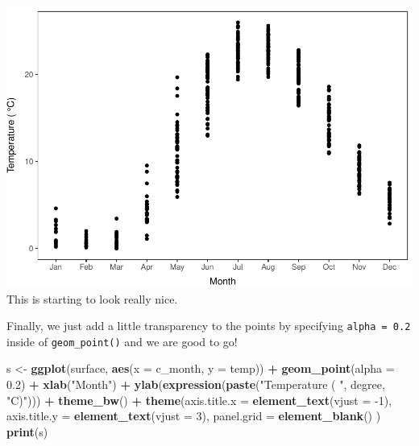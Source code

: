 \documentclass[
]{book}
\newenvironment{Shaded}{\begin{snugshade}}{\end{snugshade}}
\newcommand{\DataTypeTok}[1]{\textcolor[rgb]{0.13,0.29,0.53}{#1}}
\newcommand{\DecValTok}[1]{\textcolor[rgb]{0.00,0.00,0.81}{#1}}
\newcommand{\FloatTok}[1]{\textcolor[rgb]{0.00,0.00,0.81}{#1}}
\newcommand{\KeywordTok}[1]{\textcolor[rgb]{0.13,0.29,0.53}{\textbf{#1}}}
\newcommand{\NormalTok}[1]{#1}
\newcommand{\OperatorTok}[1]{\textcolor[rgb]{0.81,0.36,0.00}{\textbf{#1}}}
\newcommand{\StringTok}[1]{\textcolor[rgb]{0.31,0.60,0.02}{#1}}
\begin{document}
\includegraphics{worstr_files/figure-latex/unnamed-chunk-107-1.pdf}
This is starting to look really nice.

Finally, we just add a little transparency to the points by specifying \texttt{alpha\ =\ 0.2} inside of \texttt{geom\_point()} and we are good to go!

\begin{Shaded}
\begin{Highlighting}[]
\NormalTok{s <-}\StringTok{ }\KeywordTok{ggplot}\NormalTok{(surface, }\KeywordTok{aes}\NormalTok{(}\DataTypeTok{x =}\NormalTok{ c_month, }\DataTypeTok{y =}\NormalTok{ temp)) }\OperatorTok{+}
\StringTok{  }\KeywordTok{geom_point}\NormalTok{(}\DataTypeTok{alpha =} \FloatTok{0.2}\NormalTok{) }\OperatorTok{+}\StringTok{ }
\StringTok{  }\KeywordTok{xlab}\NormalTok{(}\StringTok{"Month"}\NormalTok{) }\OperatorTok{+}
\StringTok{  }\KeywordTok{ylab}\NormalTok{(}\KeywordTok{expression}\NormalTok{(}\KeywordTok{paste}\NormalTok{(}\StringTok{"Temperature ( "}\NormalTok{, degree, }\StringTok{"C)"}\NormalTok{))) }\OperatorTok{+}
\StringTok{  }\KeywordTok{theme_bw}\NormalTok{() }\OperatorTok{+}
\StringTok{  }\KeywordTok{theme}\NormalTok{(}\DataTypeTok{axis.title.x =} \KeywordTok{element_text}\NormalTok{(}\DataTypeTok{vjust =} \DecValTok{-1}\NormalTok{),}
        \DataTypeTok{axis.title.y =} \KeywordTok{element_text}\NormalTok{(}\DataTypeTok{vjust =} \DecValTok{3}\NormalTok{),}
        \DataTypeTok{panel.grid =} \KeywordTok{element_blank}\NormalTok{()}
\NormalTok{  )}
\KeywordTok{print}\NormalTok{(s)}
\end{Highlighting}
\end{Shaded}
\end{document}
